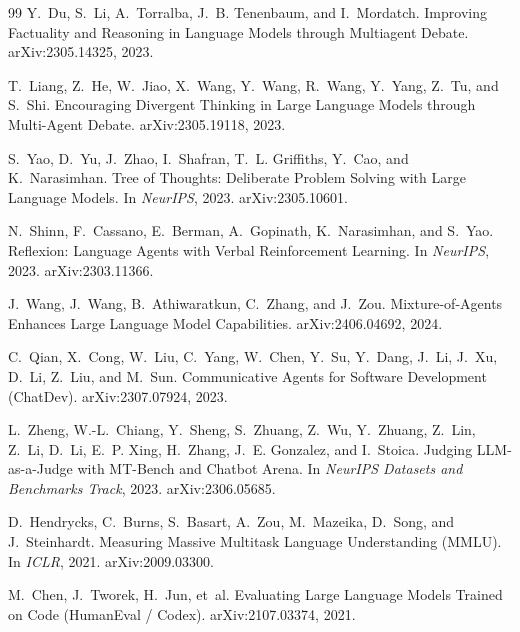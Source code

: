 \documentclass{article}
\begin{document}
\begin{thebibliography}{99}
Y.~Du, S.~Li, A.~Torralba, J.~B. Tenenbaum, and I.~Mordatch.
\newblock Improving Factuality and Reasoning in Language Models through
  Multiagent Debate.
\newblock arXiv:2305.14325, 2023.

T.~Liang, Z.~He, W.~Jiao, X.~Wang, Y.~Wang, R.~Wang, Y.~Yang, Z.~Tu, and S.~Shi.
\newblock Encouraging Divergent Thinking in Large Language Models through
  Multi-Agent Debate.
\newblock arXiv:2305.19118, 2023.

S.~Yao, D.~Yu, J.~Zhao, I.~Shafran, T.~L. Griffiths, Y.~Cao, and K.~Narasimhan.
\newblock Tree of Thoughts: Deliberate Problem Solving with Large Language Models.
\newblock In \emph{NeurIPS}, 2023.
\newblock arXiv:2305.10601.

N.~Shinn, F.~Cassano, E.~Berman, A.~Gopinath, K.~Narasimhan, and S.~Yao.
\newblock Reflexion: Language Agents with Verbal Reinforcement Learning.
\newblock In \emph{NeurIPS}, 2023.
\newblock arXiv:2303.11366.

J.~Wang, J.~Wang, B.~Athiwaratkun, C.~Zhang, and J.~Zou.
\newblock Mixture-of-Agents Enhances Large Language Model Capabilities.
\newblock arXiv:2406.04692, 2024.

C.~Qian, X.~Cong, W.~Liu, C.~Yang, W.~Chen, Y.~Su, Y.~Dang, J.~Li, J.~Xu,
  D.~Li, Z.~Liu, and M.~Sun.
\newblock Communicative Agents for Software Development (ChatDev).
\newblock arXiv:2307.07924, 2023.

L.~Zheng, W.-L.~Chiang, Y.~Sheng, S.~Zhuang, Z.~Wu, Y.~Zhuang, Z.~Lin, Z.~Li,
  D.~Li, E.~P. Xing, H.~Zhang, J.~E. Gonzalez, and I.~Stoica.
\newblock Judging LLM-as-a-Judge with MT-Bench and Chatbot Arena.
\newblock In \emph{NeurIPS Datasets and Benchmarks Track}, 2023.
\newblock arXiv:2306.05685.

D.~Hendrycks, C.~Burns, S.~Basart, A.~Zou, M.~Mazeika, D.~Song, and J.~Steinhardt.
\newblock Measuring Massive Multitask Language Understanding (MMLU).
\newblock In \emph{ICLR}, 2021.
\newblock arXiv:2009.03300.

M.~Chen, J.~Tworek, H.~Jun, et~al.
\newblock Evaluating Large Language Models Trained on Code (HumanEval / Codex).
\newblock arXiv:2107.03374, 2021.


\end{thebibliography}
\end{document}
